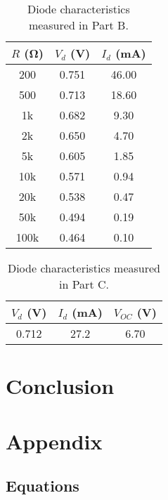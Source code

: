 \documentclass{article}
\begin{document}
\begin{table}[hbtp]
  \begin{center}
    \begin{tabular}{ccc}
      $R$ (\si{\ohm}) & $V_d$ (\si{V}) & $I_d$ (\si{mA}) \\
      \hline
      200 & 0.751 & 46.00 \\
      500 & 0.713 & 18.60 \\
      1k & 0.682 & 9.30 \\
      2k & 0.650 & 4.70 \\
      5k & 0.605 & 1.85 \\
      10k & 0.571 & 0.94 \\
      20k & 0.538 & 0.47 \\
      50k & 0.494 & 0.19 \\
      100k & 0.464 & 0.10 \\
    \end{tabular}
  \end{center}
  \caption{\label{tab:part_b} Diode characteristics measured in Part B.}
\end{table}

\begin{table}[hbtp]
  \begin{center}
    \begin{tabular}{ccc}
      $V_d$ (\si{V}) & $I_d$ (\si{mA}) & $V_{OC}$ (\si{V}) \\
      \hline
      0.712 & 27.2 & 6.70 \\
    \end{tabular}
  \end{center}
  \caption{\label{tab:part_b} Diode characteristics measured in Part C.}
\end{table}

\section{Conclusion}
\label{sec:conclusion}

\section{Appendix}
\label{sec:appendix}

\subsection*{Equations}
\end{document}
